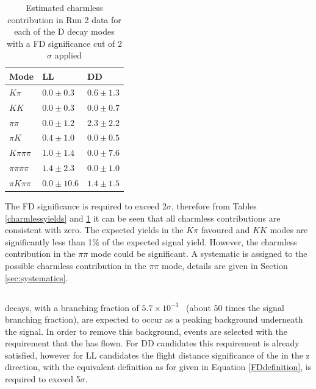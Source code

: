 \begin{table}[h] 
\centering 
\begin{tabular}{lll} 
\hline 
Mode & LL & DD \\ 
\hline 
$K\pi$ & $0.0 \pm 0.3$ & $0.6 \pm 1.3$ \\ 
$KK$ & $0.0 \pm 0.3$ & $0.0 \pm 0.7$ \\ 
$\pi\pi$ & $0.0 \pm 1.2$ & $2.3 \pm 2.2$ \\ 
$\pi K$ & $0.4 \pm 1.0$ & $0.0 \pm 0.5$ \\ 
$K\pi\pi\pi$ & $1.0 \pm 1.4$ & $0.0 \pm 7.6$ \\ 
$\pi\pi\pi\pi$ & $1.4 \pm 2.3$ & $0.0 \pm 1.0$ \\ 
$\pi K \pi\pi$ & $0.0 \pm 10.6$ & $1.4 \pm 1.5$ \\ 
\hline 
\end{tabular} 
\caption{Estimated charmless contribution in Run 2 data for each of the D decay modes with a FD significance cut of 2$\sigma$ applied} 
\label{charmlessyieldsRun2}
\end{table}

The \Dz FD significance is required to exceed 2$\sigma$, therefore from Tables \ref{charmlessyields} and \ref{charmlessyieldsRun2} it can be seen that all charmless contributions are consistent with zero. The expected yields in the $K\pi$ favoured and $KK$ modes are significantly less than 1\% of the expected signal yield. However, the charmless contribution in the $\pi\pi$ mode could be significant. A systematic is assigned to the possible charmless contribution in the $\pi\pi$ mode, details are given in Section \ref{sec:systematics}. 

\subsection{\decay{\B}{\D\pi\pi\pi}}
\label{sec:backgrounds:b2dpipipi}

\decay{\B}{\D\pi\pi\pi} decays, with a branching fraction of $5.7 \times 10^{-3}$~\cite{PDG2014} (about 50 times the signal branching fraction), are expected to occur as a peaking background underneath the signal. In order to remove this background, events are selected with the requirement that the \KS has flown. For DD candidates this requirement is already satisfied, however for LL candidates the flight distance significance of the \KS in the z direction, with the equivalent definition as for \Dz given in Equation \ref{FDdefinition}, is required to exceed 5$\sigma$. 

